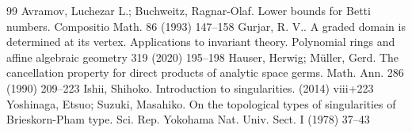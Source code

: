 \documentclass[10pt,a4paper]{amsart}
\numberwithin{equation}{section}
\numberwithin{figure}{section}
\numberwithin{equation}{section}
\begin{document}
\begin{thebibliography}{99}
 Avramov, Luchezar L.; Buchweitz, Ragnar-Olaf. Lower bounds for {B}etti numbers. Compositio Math. 86 (1993) 147--158
 Gurjar, R. V.. A graded domain is determined at its vertex. {A}pplications to invariant theory. Polynomial rings and affine algebraic geometry 319 (2020) 195--198
 Hauser, Herwig; M\"uller, Gerd. The cancellation property for direct products of analytic space germs. Math. Ann. 286 (1990) 209--223
 Ishii, Shihoko. Introduction to singularities. (2014) viii+223
 Yoshinaga, Etsuo; Suzuki, Masahiko. On the topological types of singularities of {B}rieskorn-{P}ham type. Sci. Rep. Yokohama Nat. Univ. Sect. I (1978) 37--43
\end{thebibliography}
\end{document}
